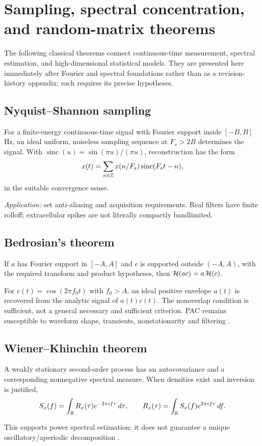 \chapter[Classical sampling and random matrices]{Sampling, spectral concentration, and random-matrix theorems}
\label{ch:classical-sampling}
The following classical theorems connect continuous-time measurement,
spectral estimation, and high-dimensional statistical models. They are
presented here immediately after Fourier and spectral foundations rather
than as a revision-history appendix; each requires its precise hypotheses.

\section{Nyquist--Shannon sampling}
\begin{theorem}
For a finite-energy continuous-time signal with Fourier support
inside $[-B,B]$ Hz, an ideal uniform, noiseless sampling sequence at
$F_s>2B$ determines the signal. With
$\operatorname{sinc}(u)=\sin(\pi u)/(\pi u)$, reconstruction has the form
\[
x(t)=\sum_{n\in\mathbb{Z}}x(n/F_s)\operatorname{sinc}(F_st-n),
\]
in the suitable convergence sense.
\end{theorem}
\emph{Application:} set anti-aliasing and acquisition requirements.
Real filters have finite rolloff; extracellular spikes are not
literally compactly bandlimited.

\section{Bedrosian's theorem}
\begin{theorem}
If $a$ has Fourier support in $[-A,A]$ and $c$ is supported
outside $(-A,A)$, with the required transform and product
hypotheses, then $\mathcal{H}(ac)=a\,\mathcal{H}(c)$.
\end{theorem}
For $c(t)=\cos(2\pi f_0t)$ with $f_0>A$, an ideal positive envelope
$a(t)$ is recovered from the analytic signal of $a(t)c(t)$.
The nonoverlap condition is sufficient, not a general necessary and
sufficient criterion. PAC remains susceptible to waveform shape,
transients, nonstationarity and filtering \cite{aru2015,cole2019}.

\section{Wiener--Khinchin theorem}
\begin{theorem}
A weakly stationary second-order process has an autocovariance and
a corresponding nonnegative spectral measure. When densities
exist and inversion is justified,
\[
S_x(f)=\int_{\mathbb{R}}R_x(\tau)e^{-2\pi if\tau}\,d\tau,\qquad
R_x(\tau)=\int_{\mathbb{R}}S_x(f)e^{2\pi if\tau}\,df.
\]
\end{theorem}
This supports power spectral estimation; it does not guarantee a unique
oscillatory/aperiodic decomposition \cite{donoghue2020,gerster2022}.

